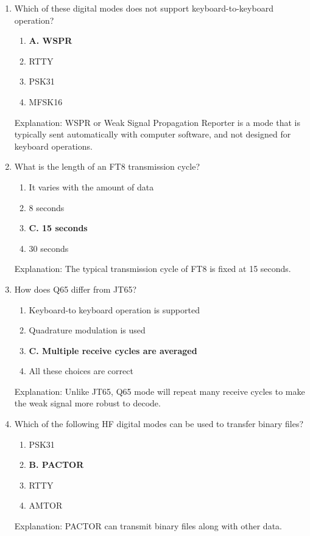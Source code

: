 \begin{enumerate}
        \item Which of these digital modes does not support keyboard-to-keyboard operation?
    \begin{enumerate}
        \item \textbf{A. WSPR}
        \item  RTTY
        \item  PSK31
         \item  MFSK16
        \end{enumerate}
        \textcolor{myred}{Explanation:}
     WSPR or Weak Signal Propagation Reporter is a mode that is typically sent automatically with computer software, and not designed for keyboard operations.
         
        \item What is the length of an FT8 transmission cycle?
       \begin{enumerate}
      \item  It varies with the amount of data
        \item  8 seconds
      \item \textbf{C. 15 seconds}
         \item  30 seconds
        \end{enumerate}
   \textcolor{myred}{Explanation:}
    The typical transmission cycle of FT8 is fixed at 15 seconds.

   \item How does Q65 differ from JT65?
        \begin{enumerate}
        \item  Keyboard-to keyboard operation is supported
        \item  Quadrature modulation is used
        \item \textbf{C. Multiple receive cycles are averaged}
        \item  All these choices are correct
    \end{enumerate}
       \textcolor{myred}{Explanation:}
    Unlike JT65, Q65 mode will repeat many receive cycles to make the weak signal more robust to decode.

   \item Which of the following HF digital modes can be used to transfer binary files?
     \begin{enumerate}
        \item  PSK31
       \item \textbf{B. PACTOR}
         \item  RTTY
        \item  AMTOR
    \end{enumerate}
     \textcolor{myred}{Explanation:}
     PACTOR can transmit binary files along with other data.
       

\end{enumerate}
